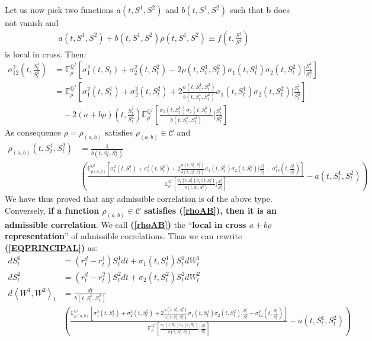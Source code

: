 \documentclass[a4paper, 12pt]{article}
\numberwithin{equation}{subsection}
\begin{document}
Let us now pick two functions $a(t,S^1,S^2)$ and $b(t,S^1,S^2)$ such that b does not vanish and
\begin{align}\label{ABequation}
a(t,S^1,S^2) + b(t,S^1,S^2)\rho(t,S^1,S^2) \equiv f\left(t,\frac{S^1}{S^2}\right)
\end{align}
is local in cross.
Then:
\begin{align}
\sigma_{12}^2(t,\frac{S_t^1}{S_t^2}) &= \mathbb{E}_\rho^{\mathbb{Q}^f}\left[\sigma_1^2(t,S_t) + \sigma_2^2(t,S_t^2) - 2\rho(t,S_t^1,S_t^2)\sigma_1(t,S_t^1)\sigma_2(t,S_t^2)|\frac{S_t^1}{S_t^2}\right]
\nonumber\\
&= \mathbb{E}_\rho^{\mathbb{Q}^f}\left[\sigma_1^2(t,S_t^1) + \sigma_2^2(t,S_t^2) + 2\frac{a(t,S_t^1,S_t^2)}{b(t,S_t^1,S_t^2)}\sigma_1 (t,S_t^1)\sigma_2(t,S_t^2)|\frac{S_t^1}{S_t^2}\right] 
\nonumber\\
&\quad - 2(a+b\rho)\left(t,\frac{S_t^1}{S_t^2}\right)\mathbb{E}_\rho^{\mathbb{Q}^f}\left[\frac{\sigma_1(t,S_t^1)\sigma_2(t,S_t^2)}{b(t,S_t^1,S_t^2)}|\frac{S_t^1}{S_t^2}\right]
\end{align}
As consequence $\rho = \rho_{(a,b)}$ satisfies $\rho_{(a,b)} \in \mathcal{C}$ and
\begin{align}\label{rhoAB}
\rho_{(a,b)}(t,S_t^1,S_t^2) &= \frac{1}{b(t,S_t^1,S_t^2)} \nonumber\\ & \left(
 \frac{\mathbb{E}_{\rho(a,b)}^{\mathbb{Q}^f}\left[\sigma_1^2(t,S_t^1) + \sigma_2^2(t,S_t^2) + 2\frac{a(t,S_t^1,S_t^2)}{b(t,S_t^1,S_t^2)}\sigma_1 (t,S_t^1)\sigma_2(t,S_t^2)|\frac{S_t^1}{S_t^2}-\sigma_{12}^2(t,\frac{S_t^1}{S_t^2})\right]}{\mathbb{E}_\rho^{\mathbb{Q}^f}[\frac{\sigma_1(t,S_t^1)\sigma_2(t,S_t^2)}{b(t,S_t^1,S_t^2)}|\frac{S_t^1}{S_t^2}]} - a(t,S_t^1,S_t^2) \right)
\end{align}
We have thus proved that any admissible correlation is of the above type. Conversely, \textbf{if a function $\rho_{(a,b)} \in \mathcal{C}$ satisfies (\ref{rhoAB}), then it is an admissible correlation}. We call \textbf{(\ref{rhoAB})} the “\textbf{local in cross $a+b\rho$ representation}” of admissible correlations.
Thus we can rewrite \textbf{(\ref{EQPRINCIPAL})} as:
\begin{align}
	d S_t^1 &= (r_t^d - r_t^1)S_t^1 dt + \sigma_1(t,S_t^1)S_t^1dW_t^1 \nonumber\\
    d S_t^2 &= (r_t^d - r_t^2)S_t^2 dt + \sigma_2(t,S_t^2)S_t^2dW_t^2 \nonumber\\
    d \left\langle W^1,W^2 \right\rangle_t &= \frac{dt}{b(t,S_t^1,S_t^2)} \\ 
    &\left(\frac{\mathbb{E}_{\rho(a,b)}^{\mathbb{Q}^f}\left[\sigma_1^2(t,S_t^1) + \sigma_2^2(t,S_t^2) + 2\frac{a(t,S_t^1,S_t^2)}{b(t,S_t^1,S_t^2)}\sigma_1 (t,S_t^1)\sigma_2(t,S_t^2)|\frac{S_t^1}{S_t^2}-\sigma_{12}^2(t,\frac{S_t^1}{S_t^2})\right]}{\mathbb{E}_\rho^{\mathbb{Q}^f}[\frac{\sigma_1(t,S_t^1)\sigma_2(t,S_t^2)}{b(t,S_t^1,S_t^2)}|\frac{S_t^1}{S_t^2}]}- a(t,S_t^1,S_t^2)\right)
\end{align}
\end{document}
